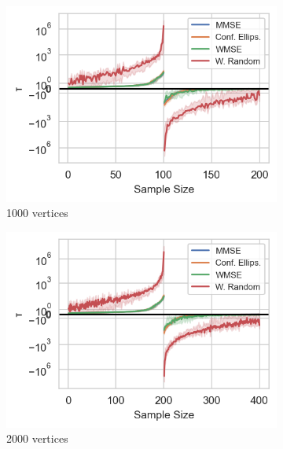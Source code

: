 \begin{figure}%
    \centering
    \begin{subfigure}{0.3\columnwidth}
    \includegraphics[width=\columnwidth]{figures/proj1/plots/LS_threshold/BA_3_1000_bandwidth_100_thresholds_LS.png}
    \caption{1000 vertices} 
    \label{snr_BA_1000}
    \end{subfigure}
    \hfill
    \begin{subfigure}{0.3\columnwidth}
    \includegraphics[width=\columnwidth]{figures/proj1/plots/LS_threshold/BA_3_2000_bandwidth_200_thresholds_LS.png}%
    \caption{2000 vertices}%
    \label{snr_BA_2000}%
    \end{subfigure}
    \hfill%
    \begin{subfigure}{0.3\columnwidth}

\end{subfigure}
\end{figure}
